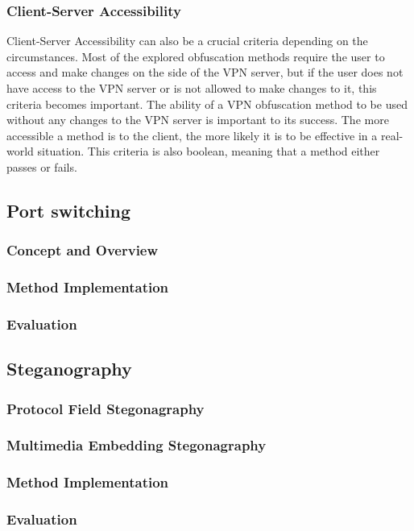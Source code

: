 \documentclass[12pt, fleqn, a4paper]{article}
\begin{document}
\subsubsection{Client-Server Accessibility}
Client-Server Accessibility can also be a crucial criteria depending on the circumstances. Most of the explored obfuscation methods require the user to access and make changes on the side of the VPN server, but if the user does not have access to the VPN server or is not allowed to make changes to it, this criteria becomes important. The ability of a VPN obfuscation method to be used without any changes to the VPN server is important to its success. The more accessible a method is to the client, the more likely it is to be effective in a real-world situation. This criteria is also boolean, meaning that a method either passes or fails.
\subsection{Port switching}
\subsubsection{Concept and Overview}
\subsubsection{Method Implementation}
\subsubsection{Evaluation}
\subsection{Steganography}
\subsubsection{Protocol Field Stegonagraphy}
\subsubsection{Multimedia Embedding Stegonagraphy}
\subsubsection{Method Implementation}
\subsubsection{Evaluation}
\end{document}
